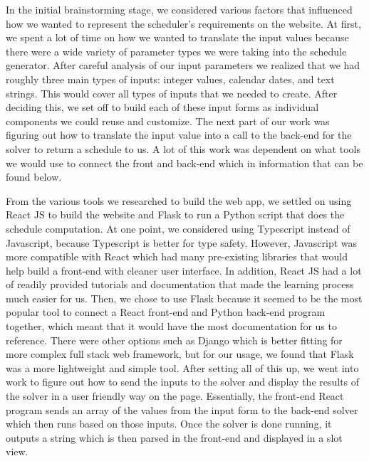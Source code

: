 \documentclass[book]{hmcclinic}
\begin{document}
In the initial brainstorming stage, we considered various factors that influenced how we wanted to represent the scheduler's requirements on the website. At first, we spent a lot of time on how we wanted to translate the input values because there were a wide variety of parameter types we were taking into the schedule generator. After careful analysis of our input parameters we realized that we had roughly three main types of inputs: integer values, calendar dates, and text strings. This would cover all types of inputs that we needed to create. After deciding this, we set off to build each of these input forms as individual components we could reuse and customize. The next part of our work was figuring out how to translate the input value into a call to the back-end for the solver to return a schedule to us. A lot of this work was dependent on what tools we would use to connect the front and back-end which in information that can be found below. 

From the various tools we researched to build the web app, we settled on using React JS to build the website and Flask to run a Python script that does the schedule computation.  At one point, we considered using Typescript instead of Javascript, because Typescript is better for type safety. However, Javascript was more compatible with React which had many pre-existing libraries that would help build a front-end with cleaner user interface. In addition, React JS had a lot of readily provided tutorials and documentation that made the learning process much easier for us. Then, we chose to use Flask because it seemed to be the most popular tool to connect a React front-end and Python back-end program together, which meant that it would have the most documentation for us to reference. There were other options such as Django which is better fitting for more complex full stack web framework, but for our usage, we found that Flask was a more lightweight and simple tool. After setting all of this up, we went into work to figure out how to send the inputs to the solver and display the results of the solver in a user friendly way on the page. Essentially, the front-end React program sends an array of the values from the input form to the back-end solver which then runs based on those inputs. Once the solver is done running, it outputs a string which is then parsed in the front-end and displayed in a slot view. 
\end{document}
